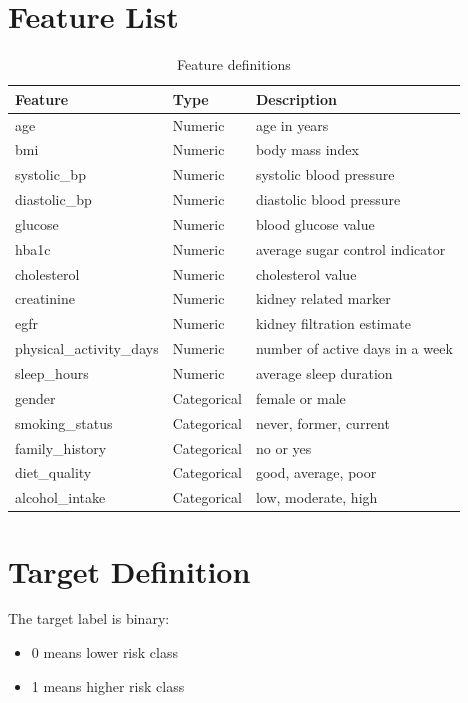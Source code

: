 \documentclass[12pt,a4paper,openany]{report}
\begin{document}
    \section{Feature List}
    \begin{table}[H]
    \centering
    \caption{Feature definitions}
    \begin{tabularx}{\textwidth}{>{\raggedright\arraybackslash}p{4.0cm} >{\raggedright\arraybackslash}p{2.1cm} X}
    \toprule
    \textbf{Feature} & \textbf{Type} & \textbf{Description} \\
    \midrule
    age & Numeric & age in years \\
    bmi & Numeric & body mass index \\
    systolic\_bp & Numeric & systolic blood pressure \\
    diastolic\_bp & Numeric & diastolic blood pressure \\
    glucose & Numeric & blood glucose value \\
    hba1c & Numeric & average sugar control indicator \\
    cholesterol & Numeric & cholesterol value \\
    creatinine & Numeric & kidney related marker \\
    egfr & Numeric & kidney filtration estimate \\
    physical\_activity\_days & Numeric & number of active days in a week \\
    sleep\_hours & Numeric & average sleep duration \\
    gender & Categorical & female or male \\
    smoking\_status & Categorical & never, former, current \\
    family\_history & Categorical & no or yes \\
    diet\_quality & Categorical & good, average, poor \\
    alcohol\_intake & Categorical & low, moderate, high \\
    \bottomrule
    \end{tabularx}
    \end{table}

    \section{Target Definition}
    The target label is binary:
    \begin{itemize}[leftmargin=1.4cm]
    \item 0 means lower risk class
    \item 1 means higher risk class
    \end{itemize}
\end{document}
